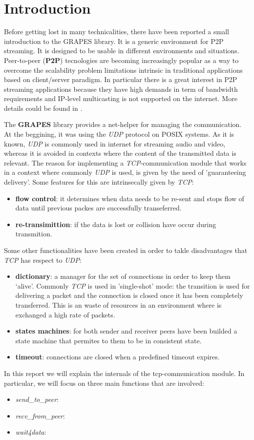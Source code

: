 \section{Introduction}
\label{ch:intro}
Before getting lost in many technicalities, there have been reported a small
introduction to the GRAPES library. It is a generic environment for P2P
streaming. It is designed to be usable in different environments and
situations. Peer-to-peer (\textbf{P2P}) tecnologies are becoming increasingly
popular as a way to overcome the scalability problem limitations intrinsic in
traditional applications based on client/server paradigm. In particular there
is a great interest in P2P streaming applications because they have high
demands in term of bandwidth requirements and IP-level multicasting is not
supported on the internet.
More details could be found in \cite{disi10-038}.

The \textbf{GRAPES} library provides a net-helper for managing the
communication. At the beggining, it was using the \textit{UDP} protocol on POSIX
systems. As it is known, \textit{UDP} is commonly used in internet for streaming audio and video,
whereas it is avoided in contexts where the content of the transmitted data is relevant.
The reason for implementing a \textit{TCP}-communication module that works in a context where
commonly \textit{UDP} is used, is given by the need of 'guaranteeing delivery'.
Some features for this are intrinsecally given by \textit{TCP}:
\begin{itemize}
\item \textbf{flow control}: it determines when data needs to be re-sent and stops flow of data until
  previous packes are successfully transeferred.
\item \textbf{re-transimittion}: if the data is lost or collision have occur during transmition.
\end{itemize}
Some other functionalities have been created in order to takle disadvantages that \textit{TCP} has
respect to \textit{UDP}:
\begin{itemize}
\item \textbf{dictionary}: a manager for the set of connections in order to keep them `alive'.
                          Commonly \textit{TCP} is used in 'single-shot' mode: the transition is
                          used for delivering a packet and the connection is closed once it has
                          been completely transferred. This is an waste of resources in an
                          environment where is exchanged a high rate of packets.
\item \textbf{states machines}: for both sender and receiver peers have been builded a state machine
                                that permites to them to be in consistent state.
\item \textbf{timeout}: connections are closed when a predefined timeout expires.
\end{itemize}

In this report we will explain the internals of the tcp-communication module.
In particular, we will focus on three main functions that are involved:
\begin{itemize}
  \item \textit{send_to_peer}:
  \item \textit{recv_from_peer}:
  \item \textit{wait4data}:
\end{itemize}

